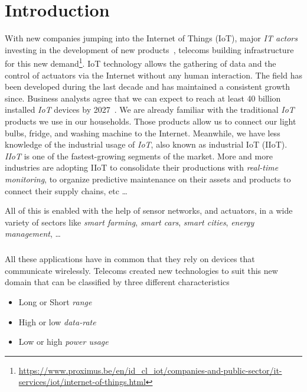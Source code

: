 \chapter{Introduction}

With new companies jumping into the Internet of Things (IoT), 
major \emph{IT actors} investing in the development of new
products~\cite{fortuneiot2019}, telecoms building infrastructure for this new 
demand\footnote{\url{https://www.proximus.be/en/id_cl_iot/companies-and-public-sector/it-services/iot/internet-of-things.html}}.
IoT technology allows the gathering of data and the control of actuators via
the Internet without any human interaction.
The field has been developed during the last decade and has maintained a
consistent growth since.
Business analysts agree that we can expect to reach at least 40 billion
installed \emph{IoT} devices by 2027~\cite{businessinsider2020}.
We are already familiar with the traditional \emph{IoT} products
we use in our households. Those products allow us to connect our light bulbs,
fridge, and washing machine to the Internet.
Meanwhile, we have less knowledge of the industrial usage of \emph{IoT}, also
known as industrial IoT (IIoT). \emph{IIoT} is one of the fastest-growing
segments of the market.
More and more industries are adopting IIoT to consolidate their productions
with \emph{real-time monitoring}, to organize predictive maintenance on their
assets and products to connect their supply chains, etc \ldots

All of this is enabled with the help of sensor networks, and actuators, in a
wide variety of sectors like \emph{smart farming}, \emph{smart cars},
\emph{smart cities}, \emph{energy management}, \ldots

\paragraph{}

All these applications have in common that they rely on devices that
communicate wirelessly.
Telecoms created new technologies to suit this new domain that can be
classified by three different characteristics

\begin{itemize}
    \item Long or Short \emph{range}
    \item High or low \emph{data-rate}
    \item Low or high \emph{power usage} 
\end{itemize}

